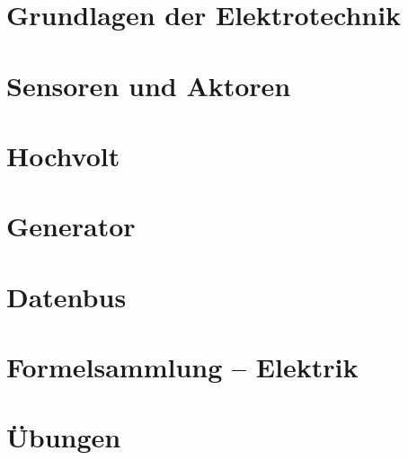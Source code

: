 



\chapter{Grundlagen der Elektrotechnik}

\chapter{Sensoren und Aktoren}

\chapter{Hochvolt}

\chapter{Generator}

\chapter{Datenbus}



\chapter{Formelsammlung -- Elektrik}


\chapter{Übungen}
